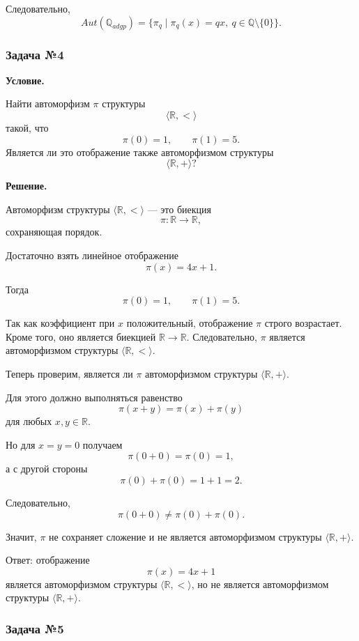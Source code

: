 \documentclass[12pt,a4paper,oneside,openany]{book}
\theoremstyle{definition}
\theoremstyle{plain}
\theoremstyle{remark}
\begin{document}
Следовательно,
\[
Aut(\mathbb{Q}_{adgp})
=
\{\pi_q\mid \pi_q(x)=qx,\ q\in\mathbb{Q}\setminus\{0\}\}.
\]


\subsubsection*{Задача №4}

\par\medskip
\textbf{Условие.}
\par\smallskip

Найти автоморфизм $\pi$ структуры
\[
\langle \mathbb{R},<\rangle
\]
такой, что
\[
\pi(0)=1,
\qquad
\pi(1)=5.
\]
Является ли это отображение также автоморфизмом структуры
\[
\langle \mathbb{R},+\rangle?
\]

\par\medskip
\textbf{Решение.}
\par\smallskip

Автоморфизм структуры $\langle \mathbb{R},<\rangle$ — это биекция
\[
\pi:\mathbb{R}\to\mathbb{R},
\]
сохраняющая порядок.

Достаточно взять линейное отображение
\[
\pi(x)=4x+1.
\]

Тогда
\[
\pi(0)=1,
\qquad
\pi(1)=5.
\]

Так как коэффициент при $x$ положительный, отображение $\pi$ строго возрастает. Кроме того, оно является биекцией $\mathbb{R}\to\mathbb{R}$. Следовательно, $\pi$ является автоморфизмом структуры $\langle \mathbb{R},<\rangle$.

Теперь проверим, является ли $\pi$ автоморфизмом структуры $\langle \mathbb{R},+\rangle$.

Для этого должно выполняться равенство
\[
\pi(x+y)=\pi(x)+\pi(y)
\]
для любых $x,y\in\mathbb{R}$.

Но для $x=y=0$ получаем
\[
\pi(0+0)=\pi(0)=1,
\]
а с другой стороны
\[
\pi(0)+\pi(0)=1+1=2.
\]

Следовательно,
\[
\pi(0+0)\neq \pi(0)+\pi(0).
\]

Значит, $\pi$ не сохраняет сложение и не является автоморфизмом структуры $\langle \mathbb{R},+\rangle$.

Ответ: отображение
\[
\pi(x)=4x+1
\]
является автоморфизмом структуры $\langle \mathbb{R},<\rangle$, но не является автоморфизмом структуры $\langle \mathbb{R},+\rangle$.


\subsubsection*{Задача №5}
\end{document}
